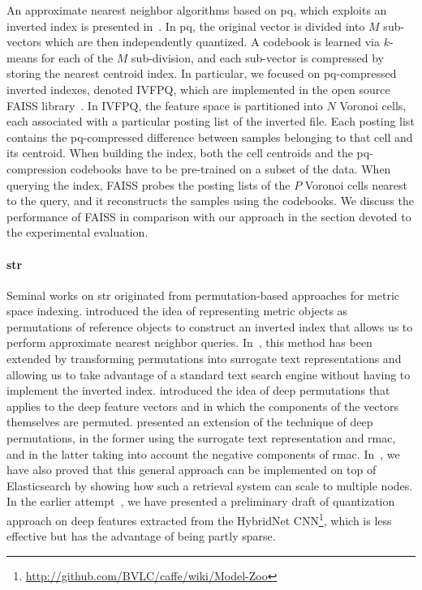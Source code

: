 An approximate nearest neighbor algorithms based on \acrfull{pq}, which exploits an inverted index is presented in~\cite{jegou2011product}.
In \gls{pq}, the original vector is divided into $M$ sub-vectors which are then independently quantized.
A codebook is learned via $k$-means for each of the $M$ sub-division, and each sub-vector is compressed by storing the nearest centroid index.
In particular, we focused on \gls{pq}-compressed inverted indexes, denoted IVFPQ, which are implemented in the open source FAISS library~\cite{johnson2017billion}.
In IVFPQ, the feature space is partitioned into $N$ Voronoi cells, each associated with a particular posting list of the inverted file.
Each posting list contains the \gls{pq}-compressed difference between samples belonging to that cell and its centroid.
When building the index, both the cell centroids and the \gls{pq}-compression codebooks have to be pre-trained on a subset of the data.
When querying the index, FAISS probes the posting lists of the $P$ Voronoi cells nearest to the query, and it reconstructs the samples using the codebooks.
We discuss the performance of FAISS in comparison with our approach in the section devoted to the experimental evaluation.

\paragraph{\acrlong{str}}
Seminal works on \gls{str} originated from permutation-based approaches for metric space indexing.
\citet{amato2014mi} introduced the idea of representing metric objects as permutations of reference objects to construct an inverted index that allows us to perform approximate nearest neighbor queries.
In~\cite{gennaro2010approach}, this method has been extended by transforming permutations into surrogate text representations and allowing us to take advantage of a standard text search engine without having to implement the inverted index.
\citet{amato2016deep} introduced the idea of deep permutations that applies to the deep feature vectors and in which the components of the vectors themselves are permuted.
\citet{amato2017efficient,amato2018large} presented an extension of the technique of deep permutations, in the former using the surrogate text representation and \gls{rmac}, and in the latter taking into account the negative components of \gls{rmac}.
In~\cite{amato2018large}, we have also proved that this general approach can be implemented on top of Elasticsearch by showing how such a retrieval system can scale to multiple nodes.
In the earlier attempt~\cite{amato2016large}, we have presented a preliminary draft of quantization approach on deep features extracted from the HybridNet CNN\footnote{\url{http://github.com/BVLC/caffe/wiki/Model-Zoo}}, which is less effective but has the advantage of being partly sparse.

